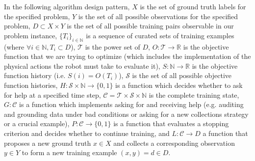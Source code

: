In the following algorithm design pattern, 
$X$ is the set of ground truth labels for the specified problem,
$Y$ is the set of all possible observations for the specified problem,
\mbox{$D \subset X \times Y$} is the set of all possible training pairs observable in our problem instance,
\mbox{$\{T_i\}_{i \in \mathbb{N}}$} is a sequence of curated sets of training examples (where \mbox{$\forall i \in \mathbb{N}, T_i \subset D$}),  
$\mathcal{T}$ is the power set of $D$,
\mbox{$O: \mathcal{T} \to \mathbb{R}$} is the objective function that we are trying to optimize 
(which includes the implementation of the physical actions the robot must take to evaluate it),
\mbox{$S: \mathbb{N} \to \mathbb{R}$} is the objective function history (i.e. \mbox{$S(i) = O(T_i)$}),
$\mathcal{S}$ is the set of all possible objective function histories,
\mbox{$H: \mathcal{S} \times \mathbb{N} \to \{0,1\}$} is a function which decides whether to ask for help at
a specified time step,
\mbox{$\mathcal{C} = \mathcal{T} \times \mathcal{S} \times \mathbb{N}$} is the complete training state,
\mbox{$G: \mathcal{C}$} is a function which implements asking for and receiving help (e.g. auditing and grounding data under bad conditions
or asking for a new collections strategy or a crucial example),
\mbox{$P: \mathcal{C} \to \{0,1\}$} is a function that evaluates a stopping criterion and decides whether to continue training,
and \mbox{$L: \mathcal{C} \to D$} a function that proposes a new ground truth $x \in X$ and collects a corresponding observation $y \in Y$ to form
a new training example \mbox{$(x,y) = d \in D$}. 

